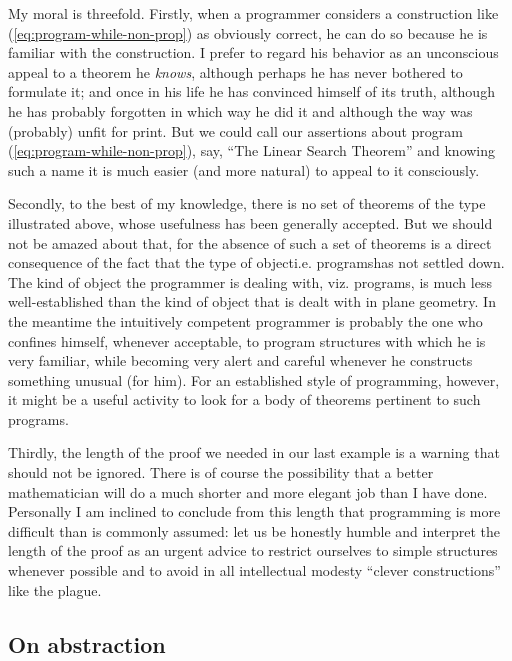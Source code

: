 \documentclass[twoside,11pt]{book}
\begin{document}
My moral is threefold. Firstly, when a programmer considers a construction like (\ref{eq:program-while-non-prop}) as obviously correct, he can do so because he is familiar with the construction. I prefer to regard his behavior as an unconscious appeal to a theorem he \textit{knows}, although perhaps he has never bothered to formulate it; and once in his life he has convinced himself of its truth, although he has probably forgotten in which way he did it and although the way was (probably) unfit for print. But we could call our assertions about program (\ref{eq:program-while-non-prop}), say, ``The Linear Search Theorem'' and knowing such a name it is much easier (and more natural) to appeal to it consciously.

Secondly, to the best of my knowledge, there is no set of theorems of the type illustrated above, whose usefulness has been generally accepted. But we should not be amazed about that, for the absence of such a set of theorems is a direct consequence of the fact that the type of object\textemdash{}i.e. programs\textemdash{}has not settled down. The kind of object the programmer is dealing with, viz. programs, is much less well-established than the kind of object that is dealt with in plane geometry. In the meantime the intuitively competent programmer is probably the one who confines himself, whenever acceptable, to program structures with which he is very familiar, while becoming very alert and careful whenever he constructs something unusual (for him). For an established style of programming, however, it might be a useful activity to look for a body of theorems pertinent to such programs.

Thirdly, the length of the proof we needed in our last example is a warning that should not be ignored. There is of course the possibility that a better mathematician will do a much shorter and more elegant job than I have done. Personally I am inclined to conclude from this length that programming is more difficult than is commonly assumed: let us be honestly humble and interpret the length of the proof as an urgent advice to restrict ourselves to simple structures whenever possible and to avoid in all intellectual modesty ``clever constructions'' like the plague.

\subsection{On abstraction}
\end{document}
